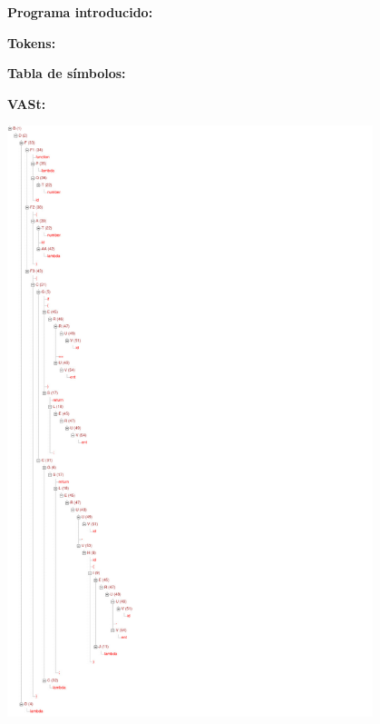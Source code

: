 \documentclass[11pt, , a4paper, titlepage]{article}
\newenvironment{changemargin}[2]{%
\begin{list}{}{%
\setlength{\topsep}{0pt}%
\setlength{\leftmargin}{#1}%
\setlength{\rightmargin}{#2}%
\setlength{\listparindent}{\parindent}%
\setlength{\itemindent}{\parindent}%
\setlength{\parsep}{\parskip}%
}%
\item[]}{\end{list}}
\begin{document}
\begin{changemargin}{+0.5cm}{+0cm}
    \vspace{1mm}

    \textbf{Programa introducido:}
    \begin{changemargin}{+0.5cm}{+0cm}
        
    \end{changemargin}

    \vspace{2mm}

    \textbf{Tokens:}
    \vspace{1mm}
    \begin{changemargin}{+0.5cm}{+0cm}
    \end{changemargin}

    \vspace{3mm}

    \textbf{Tabla de símbolos:}
    \vspace{1mm}
    \begin{changemargin}{+0.5cm}{+0cm}
    \end{changemargin}

    \vspace{2mm}

    \textbf{VASt:}
    \vspace{1mm}
    \begin{center}
        \includegraphics[width=0.8\textwidth]{./resources/test-cases/case-2/tree.jpg}
    \end{center}

\end{changemargin}
\end{document}
